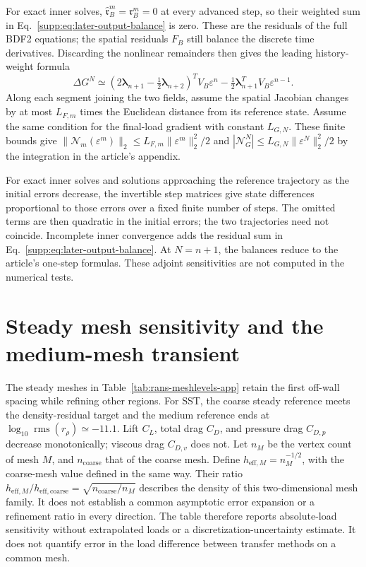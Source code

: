\documentclass[11pt,a4paper]{article}
\newcommand{\eps}{\varepsilon}
\begin{document}
For exact inner solves, $\widehat{\mathfrak r}_B^m=\mathfrak r_B^m=0$ at every advanced step, so their weighted sum in Eq.~\eqref{supp:eq:later-output-balance} is zero. These are the residuals of the full BDF2 equations; the spatial residuals $F_B$ still balance the discrete time derivatives. Discarding the nonlinear remainders then gives the leading history-weight formula
\begin{equation}
 \Delta G^N \simeq
 (2\boldsymbol\lambda_{n+1}-\tfrac12\boldsymbol\lambda_{n+2})^T V_B\eps^n
 -\tfrac12\boldsymbol\lambda_{n+1}^T V_B\eps^{n-1}.
 \label{supp:eq:later-history-weights}
\end{equation}
Along each segment joining the two fields, assume the spatial Jacobian changes by at most $L_{F,m}$ times the Euclidean distance from its reference state. Assume the same condition for the final-load gradient with constant $L_{G,N}$. These finite bounds give $\|\mathcal N_m(\eps^m)\|_2\leq L_{F,m}\|\eps^m\|_2^2/2$ and $|\mathcal N_G^N|\leq L_{G,N}\|\eps^N\|_2^2/2$ by the integration in the article's appendix.

For exact inner solves and solutions approaching the reference trajectory as the initial errors decrease, the invertible step matrices give state differences proportional to those errors over a fixed finite number of steps. The omitted terms are then quadratic in the initial errors; the two trajectories need not coincide. Incomplete inner convergence adds the residual sum in Eq.~\eqref{supp:eq:later-output-balance}. At $N=n+1$, the balances reduce to the article's one-step formulas. These adjoint sensitivities are not computed in the numerical tests.

\section{Steady mesh sensitivity and the medium-mesh transient}
\label{supp:mesh-sensitivity}

The steady meshes in Table~\ref{tab:rans-meshlevels-app} retain the first off-wall spacing while refining other regions. For SST, the coarse steady reference meets the density-residual target and the medium reference ends at $\log_{10}\operatorname{rms}(r_\rho)\simeq-11.1$. Lift $C_L$, total drag $C_D$, and pressure drag $C_{D,p}$ decrease monotonically; viscous drag $C_{D,v}$ does not. Let $n_M$ be the vertex count of mesh $M$, and $n_{\mathrm{coarse}}$ that of the coarse mesh. Define $h_{\mathrm{eff},M}=n_M^{-1/2}$, with the coarse-mesh value defined in the same way. Their ratio $h_{\mathrm{eff},M}/h_{\mathrm{eff,coarse}}=\sqrt{n_{\mathrm{coarse}}/n_M}$ describes the density of this two-dimensional mesh family. It does not establish a common asymptotic error expansion or a refinement ratio in every direction. The table therefore reports absolute-load sensitivity without extrapolated loads or a discretization-uncertainty estimate. It does not quantify error in the load difference between transfer methods on a common mesh.
\end{document}
